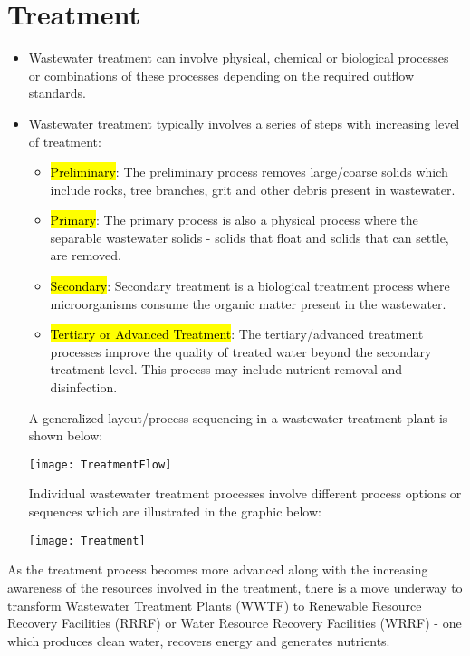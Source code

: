 \section{Treatment}

\begin{itemize}
\item Wastewater treatment can involve physical, chemical or biological processes or combinations of these processes depending on the required outflow standards. 
\item Wastewater treatment typically involves a series of steps with increasing level of treatment:
\begin{itemize}
\item \hl{Preliminary}:  The preliminary process removes large/coarse solids which include rocks, tree branches, grit and other debris present in wastewater.
\item \hl{Primary}:  The primary process is also a physical process where the separable wastewater solids - solids that float and solids that can settle, are removed.  
\item \hl{Secondary}:  Secondary treatment is a biological treatment process where microorganisms consume the organic matter present in the wastewater. 
\item \hl{Tertiary or Advanced Treatment}:  The tertiary/advanced treatment processes improve the quality of treated water beyond the secondary treatment level.  This process may include nutrient removal and disinfection.
\end{itemize}

A generalized layout/process sequencing in a wastewater treatment plant is shown below:
\begin{center}
\texttt{[image: TreatmentFlow]}
\end{center}
Individual wastewater treatment processes involve different process options or sequences which are illustrated in the graphic below:
\begin{center}
\texttt{[image: Treatment]}
\end{center}
\end{itemize}
As the treatment process becomes more advanced along with the increasing awareness of the resources involved in the treatment, there is a move underway to transform Wastewater Treatment Plants (WWTF) to Renewable Resource Recovery Facilities (RRRF) or Water Resource Recovery Facilities (WRRF) - one which produces clean water, recovers energy and generates nutrients.

